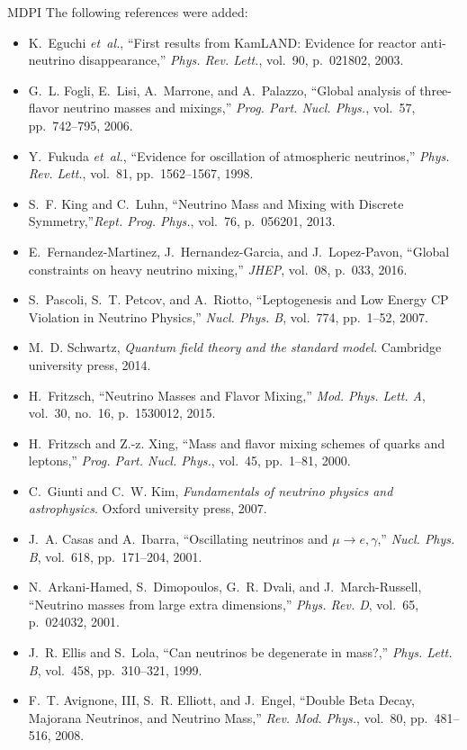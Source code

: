\documentclass[a4paper, 10pt]{letter}
\begin{document}
\begin{letter}{MDPI}
The following references were added:
\begin{itemize}
    \item K.~Eguchi {\em et~al.}, ``{First results from KamLAND: Evidence for reactor anti-neutrino disappearance},'' {\em Phys. Rev. Lett.}, vol.~90, p.~021802, 2003.
    \item G.~L. Fogli, E.~Lisi, A.~Marrone, and A.~Palazzo, ``{Global analysis of three-flavor neutrino masses and mixings},'' {\em Prog. Part. Nucl. Phys.}, vol.~57, pp.~742--795, 2006.
    \item Y.~Fukuda {\em et~al.}, ``{Evidence for oscillation of atmospheric neutrinos},'' {\em Phys. Rev. Lett.}, vol.~81, pp.~1562--1567, 1998.
    \item S.~F. King and C.~Luhn, ``{Neutrino Mass and Mixing with Discrete Symmetry},''{\em Rept. Prog. Phys.}, vol.~76, p.~056201, 2013.
    \item E.~Fernandez-Martinez, J.~Hernandez-Garcia, and J.~Lopez-Pavon, ``{Global constraints on heavy neutrino mixing},'' {\em JHEP}, vol.~08, p.~033, 2016.
    \item S.~Pascoli, S.~T. Petcov, and A.~Riotto, ``{Leptogenesis and Low Energy CP Violation in Neutrino Physics},'' {\em Nucl. Phys. B}, vol.~774, pp.~1--52, 2007.
    \item M.~D. Schwartz, {\em Quantum field theory and the standard model}. Cambridge university press, 2014.
    \item H.~Fritzsch, ``{Neutrino Masses and Flavor Mixing},'' {\em Mod. Phys. Lett. A}, vol.~30, no.~16, p.~1530012, 2015.
    \item H.~Fritzsch and Z.-z. Xing, ``{Mass and flavor mixing schemes of quarks and leptons},'' {\em Prog. Part. Nucl. Phys.}, vol.~45, pp.~1--81, 2000.
    \item C.~Giunti and C.~W. Kim, {\em Fundamentals of neutrino physics and astrophysics}. Oxford university press, 2007.
    \item J.~A. Casas and A.~Ibarra, ``{Oscillating neutrinos and $\mu \to e, \gamma$},'' {\em Nucl. Phys. B}, vol.~618, pp.~171--204, 2001.
    \item N.~Arkani-Hamed, S.~Dimopoulos, G.~R. Dvali, and J.~March-Russell, ``{Neutrino masses from large extra dimensions},'' {\em Phys. Rev. D}, vol.~65, p.~024032, 2001.    
    \item J.~R. Ellis and S.~Lola, ``{Can neutrinos be degenerate in mass?},'' {\em Phys. Lett. B}, vol.~458, pp.~310--321, 1999.
    \item F.~T. Avignone, III, S.~R. Elliott, and J.~Engel, ``{Double Beta Decay, Majorana Neutrinos, and Neutrino Mass},'' {\em Rev. Mod. Phys.}, vol.~80, pp.~481--516, 2008.

\end{itemize}
\end{letter}
\end{document}
